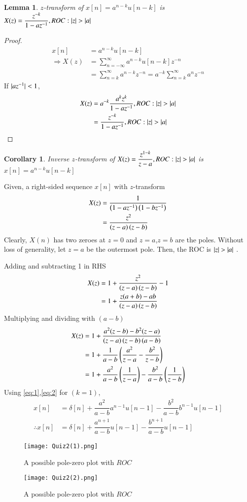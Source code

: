 \documentclass[journal,12pt,twocolumn]{IEEEtran}
\newtheorem{corollary}{Corollary}[theorem]
\newtheorem{lemma}[theorem]{Lemma}
\begin{document}
\begin{lemma}
$z$-transform of $x[n]=a^{n-k}u[n-k]$ is $X(z)=\dfrac{z^{-k}}{1-az^{-1}},ROC:\vert z\vert>\vert a\vert$
\end{lemma}
\begin{proof}
\begin{align}
    x[n]&=a^{n-k}u[n-k]\\
    \Rightarrow X(z)&=\displaystyle\sum_{n=-\infty}^{\infty}a^{n-k}u[n-k]z^{-n}\\
    &=\displaystyle\sum_{n=k}^{\infty}a^{n-k}z^{-n}=a^{-k}\displaystyle\sum_{n=k}^{\infty}a^{n}z^{-n}
\end{align}
If $\vert az^{-1}\vert<1$, 
\begin{align}
    X(z)&=a^{-k}\dfrac{a^kz^k}{1-az^{-1}},ROC:\vert z\vert>\vert a\vert\\
    &=\dfrac{z^{-k}}{1-az^{-1}},ROC:\vert z\vert>\vert a\vert
\end{align}
\end{proof}
\begin{corollary}
    Inverse $z$-transform of $X(z)=\dfrac{z^{1-k}}{z-a},ROC:\vert z\vert>\vert a\vert$ is $x[n]=a^{n-k}u[n-k]$
    \label{eq:2}
\end{corollary}

Given, a right-sided sequence $x[n]$ with $z$-transform 
\begin{align}
   X(z)&=\dfrac{1}{\left(1-az^{-1}\right)\left(1-bz^{-1}\right)}\\
   &=\dfrac{z^2}{\left(z-a\right)\left(z-b\right)} 
\end{align}
Clearly, $X(n)$ has two zeroes at $z=0$ and $z=a$,$z=b$ are the poles. Without loss of generality, let $z=a$ be the outermost pole. Then, the ROC is $\vert z\vert>\vert a\vert$ .


Adding and subtracting 1 in RHS
\begin{align}
    X(z)&=1+\dfrac{z^2}{\left(z-a\right)\left(z-b\right)} -1\\
    &=1+\dfrac{z(a+b)-ab}{\left(z-a\right)\left(z-b\right)}
\end{align}
Multiplying and dividing with $(a-b)$
\begin{align}
    X(z)&=1+\dfrac{a^2(z-b)-b^2(z-a)}{\left(z-a\right)\left(z-b\right)\left(a-b\right)}\\
    &=1+\dfrac{1}{a-b}\left(\dfrac{a^2}{z-a}-\dfrac{b^2}{z-b}\right)\\
    &=1+\dfrac{a^2}{a-b}\left(\dfrac{1}{z-a}\right)-\dfrac{b^2}{a-b}\left(\dfrac{1}{z-b}\right)
\end{align}
Using \eqref{eq:1},\eqref{eq:2} for $(k=1)$,
\begin{align}
    x[n]&=\delta[n]+\dfrac{a^2}{a-b}a^{n-1}u[n-1]-\dfrac{b^2}{a-b}b^{n-1}u[n-1]\\
    \therefore x[n]&=\delta[n]+\dfrac{a^{n+1}}{a-b}u[n-1]-\dfrac{b^{n+1}}{a-b}u[n-1]
\end{align}
\begin{figure}[!h]
 \centering
 \texttt{[image: Quiz2(1).png]}
 \caption{A possible pole-zero plot with $ROC$}
 \label{plot}
\end{figure}
\begin{figure}[!h]
 \centering
 \texttt{[image: Quiz2(2).png]}
 \caption{A possible pole-zero plot with $ROC$}
 \label{plot}
\end{figure}
\end{document}
